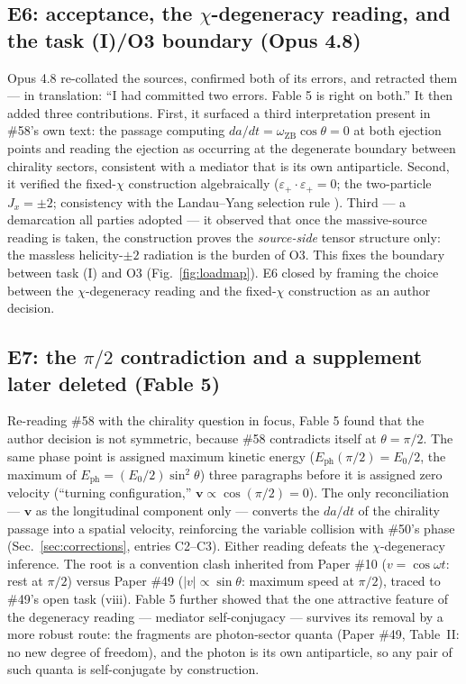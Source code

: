 \documentclass[%
 reprint, amsmath,amssymb, aps, prb, ]{revtex4-2}
\numberwithin{equation}{section}
\newcommand{\iphase}{\theta}  %
\newcommand{\omZB}{\omega_{\text{ZB}}}
\newcommand{\EphS}{E_{\text{ph}}}
\begin{document}
\subsection{E6: acceptance, the $\chi$-degeneracy reading, and the task (I)/O3 boundary (Opus 4.8)}

Opus 4.8 re-collated the sources, confirmed both of its errors, and retracted them --- in translation: ``I had committed two errors. Fable 5 is right on both.'' It then added three contributions. First, it surfaced a third interpretation present in \#58's own text: the passage computing $da/dt=\omZB\cos\iphase=0$ at both ejection points and reading the ejection as occurring at the degenerate boundary between chirality sectors, consistent with a mediator that is its own antiparticle. Second, it verified the fixed-$\chi$ construction algebraically ($\varepsilon_+\cdot\varepsilon_+=0$; the two-particle $J_x=\pm2$; consistency with the Landau--Yang selection rule \cite{landau,yang}). Third --- a demarcation all parties adopted --- it observed that once the massive-source reading is taken, the construction proves the \emph{source-side} tensor structure only: the massless helicity-$\pm2$ radiation is the burden of O3. This fixes the boundary between task (I) and O3 (Fig.~\ref{fig:loadmap}). E6 closed by framing the choice between the $\chi$-degeneracy reading and the fixed-$\chi$ construction as an author decision.

\subsection{E7: the $\pi/2$ contradiction and a supplement later deleted (Fable 5)}

Re-reading \#58 with the chirality question in focus, Fable 5 found that the author decision is not symmetric, because \#58 contradicts itself at $\iphase=\pi/2$. The same phase point is assigned maximum kinetic energy ($\EphS(\pi/2)=E_0/2$, the maximum of $\EphS=(E_0/2)\sin^2\iphase$) three paragraphs before it is assigned zero velocity (``turning configuration,'' $\mathbf v\propto\cos(\pi/2)=0$). The only reconciliation --- $\mathbf v$ as the longitudinal component only --- converts the $da/dt$ of the chirality passage into a spatial velocity, reinforcing the variable collision with \#50's phase (Sec.~\ref{sec:corrections}, entries C2--C3). Either reading defeats the $\chi$-degeneracy inference. The root is a convention clash inherited from Paper \#10 \cite{hanamura10} ($v=\cos\omega t$: rest at $\pi/2$) versus Paper \#49 ($|v|\propto\sin\iphase$: maximum speed at $\pi/2$), traced to \#49's open task (viii). Fable 5 further showed that the one attractive feature of the degeneracy reading --- mediator self-conjugacy --- survives its removal by a more robust route: the fragments are photon-sector quanta (Paper \#49, Table~II: no new degree of freedom), and the photon is its own antiparticle, so any pair of such quanta is self-conjugate by construction.
\end{document}
